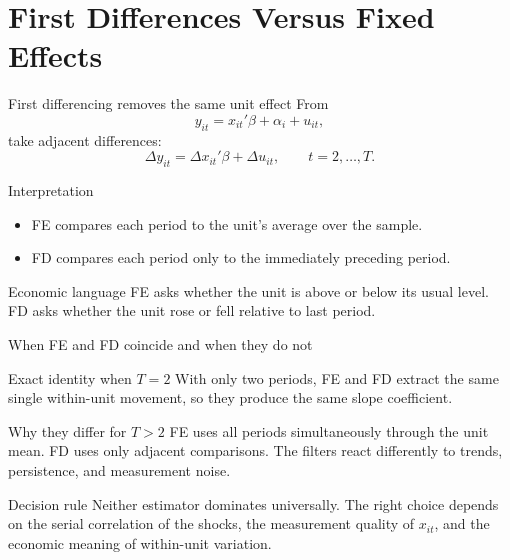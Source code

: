 \documentclass[10pt]{beamer}
\begin{document}
\section{First Differences Versus Fixed Effects}

\begin{frame}{First differencing removes the same unit effect}
\label{slide:fdidea}
\small
From
\[
y_{it} = x_{it}'\beta + \alpha_i + u_{it},
\]
take adjacent differences:
\[
\Delta y_{it} = \Delta x_{it}'\beta + \Delta u_{it},
\qquad t=2,\ldots,T.
\]

\begin{block}{Interpretation}
\begin{itemize}
  \item FE compares each period to the unit's average over the sample.
  \item FD compares each period only to the immediately preceding period.
\end{itemize}
\end{block}

\pause
\begin{exampleblock}{Economic language}
FE asks whether the unit is above or below its usual level. FD asks whether the unit rose or fell relative to last period.
\end{exampleblock}
\end{frame}

\begin{frame}{When FE and FD coincide and when they do not}
\label{slide:fevfd}
\small
\begin{block}{Exact identity when $T=2$}
With only two periods, FE and FD extract the same single within-unit movement, so they produce the same slope coefficient.
\end{block}

\pause
\begin{block}{Why they differ for $T>2$}
FE uses all periods simultaneously through the unit mean. FD uses only adjacent comparisons. The filters react differently to trends, persistence, and measurement noise.
\end{block}

\pause
\begin{alertblock}{Decision rule}
Neither estimator dominates universally. The right choice depends on the serial correlation of the shocks, the measurement quality of $x_{it}$, and the economic meaning of within-unit variation.
\end{alertblock}

\hfill\hyperlink{app:fe_fd_t2}{}
\end{frame}
\end{document}
